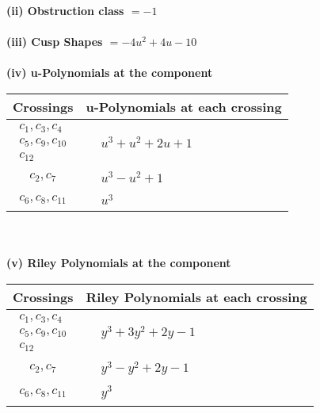 \documentclass[1p]{elsarticle_modified}
\theoremstyle{definition}
\begin{document}
\flushleft \textbf{(ii) Obstruction class $= -1$}\\~\\
\flushleft \textbf{(iii) Cusp Shapes $= -4 u^2+4 u-10$}\\~\\
\newpage\renewcommand{\arraystretch}{1}
\flushleft \textbf{(iv) u-Polynomials at the component}\newline \\
\begin{tabular}{m{50pt}|m{274pt}}
Crossings & \hspace{64pt}u-Polynomials at each crossing \\
\hline $$\begin{aligned}c_{1},c_{3},c_{4}\\c_{5},c_{9},c_{10}\\c_{12}\end{aligned}$$&$\begin{aligned}
&u^3+u^2+2 u+1
\end{aligned}$\\
\hline $$\begin{aligned}c_{2},c_{7}\end{aligned}$$&$\begin{aligned}
&u^3- u^2+1
\end{aligned}$\\
\hline $$\begin{aligned}c_{6},c_{8},c_{11}\end{aligned}$$&$\begin{aligned}
&u^3
\end{aligned}$\\
\hline
\end{tabular}\\~\\
\newpage\renewcommand{\arraystretch}{1}
\flushleft \textbf{(v) Riley Polynomials at the component}\newline \\
\begin{tabular}{m{50pt}|m{274pt}}
Crossings & \hspace{64pt}Riley Polynomials at each crossing \\
\hline $$\begin{aligned}c_{1},c_{3},c_{4}\\c_{5},c_{9},c_{10}\\c_{12}\end{aligned}$$&$\begin{aligned}
&y^3+3 y^2+2 y-1
\end{aligned}$\\
\hline $$\begin{aligned}c_{2},c_{7}\end{aligned}$$&$\begin{aligned}
&y^3- y^2+2 y-1
\end{aligned}$\\
\hline $$\begin{aligned}c_{6},c_{8},c_{11}\end{aligned}$$&$\begin{aligned}
&y^3
\end{aligned}$\\
\hline
\end{tabular}\\~\\
\end{document}
